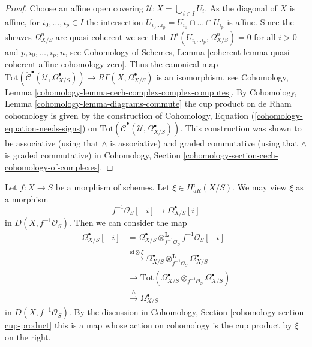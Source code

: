 \begin{proof}
Choose an affine open covering $\mathcal{U} : X = \bigcup_{i \in I} U_i$.
As the diagonal of $X$ is affine, for $i_0, \ldots, i_p \in I$
the intersection $U_{i_0 \ldots i_p} = U_{i_0} \cap \ldots \cap U_{i_p}$
is affine. Since the sheaves $\Omega^n_{X/S}$ are quasi-coherent we see that
$H^i(U_{i_0 \ldots i_p}, \Omega^n_{X/S}) = 0$ for all $i > 0$
and $p, i_0, \ldots, i_p, n$, see
Cohomology of Schemes, Lemma
\ref{coherent-lemma-quasi-coherent-affine-cohomology-zero}.
Thus the canonical map
$\text{Tot}(\check{\mathcal{C}}^\bullet(\mathcal{U}, \Omega_{X/S}^\bullet))
\to R\Gamma(X, \Omega_{X/S}^\bullet)$ is an isomorphism, see
Cohomology, Lemma \ref{cohomology-lemma-cech-complex-complex-computes}.
By Cohomology, Lemma \ref{cohomology-lemma-diagrams-commute}
the cup product on de Rham cohomology is given by the construction
of Cohomology, Equation (\ref{cohomology-equation-needs-signs}) on
$\text{Tot}(\check{\mathcal{C}}^\bullet(\mathcal{U}, \Omega_{X/S}^\bullet))$.
This construction was shown to be associative (using that $\wedge$
is associative) and graded commutative
(using that $\wedge$ is graded commutative) in
Cohomology, Section \ref{cohomology-section-cech-cohomology-of-complexes}.
\end{proof}

\begin{remark}
\label{remark-cup-product-as-a-map}
Let $f : X \to S$ be a morphism of schemes. Let $\xi \in H_{dR}^i(X/S)$.
We may view $\xi$ as a morphism
$$
f^{-1}\mathcal{O}_S[-i] \longrightarrow \Omega^\bullet_{X/S}[i]
$$
in $D(X, f^{-1}\mathcal{O}_S)$. Then we can consider the map
\begin{align*}
\Omega^\bullet_{X/S}[-i]
& =
\Omega^\bullet_{X/S} \otimes_{f^{-1}\mathcal{O}_S}^\mathbf{L}
f^{-1}\mathcal{O}_S[-i] \\
& \xrightarrow{\text{id} \otimes \xi}
\Omega^\bullet_{X/S} \otimes_{f^{-1}\mathcal{O}_S}^\mathbf{L}
\Omega^\bullet_{X/S} \\
& \to
\text{Tot}(\Omega^\bullet_{X/S} \otimes_{f^{-1}\mathcal{O}_S}
\Omega^\bullet_{X/S}) \\
& \xrightarrow{\wedge}
\Omega^\bullet_{X/S}
\end{align*}
in $D(X, f^{-1}\mathcal{O}_S)$. By the discussion in
Cohomology, Section \ref{cohomology-section-cup-product} this is a map
whose action on cohomology is the cup product by $\xi$ on the right.
\end{remark}




